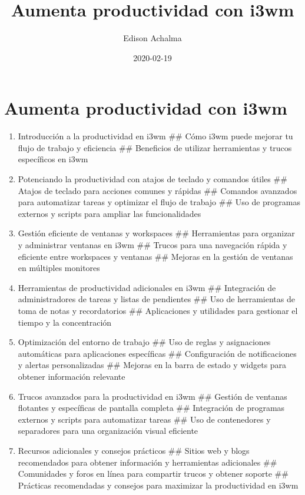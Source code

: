 \documentclass[
  jou,
  floatsintext,
  longtable,
  a4paper,
  nolmodern,
  notxfonts,
  notimes,
  12pt,
  colorlinks=true,linkcolor=blue,citecolor=blue,urlcolor=blue]{apa7}
\title{Aumenta productividad con i3wm}
\author{Edison Achalma}
\affiliation{
{Escuela Profesional de Economía, Universidad Nacional de San Cristóbal
de Huamanga}}
\date{2020-02-19}
\begin{document}
\maketitle


\hypertarget{toc}{}
\tableofcontents
\newpage
\section[Introduction]{Aumenta productividad con i3wm}

\setcounter{secnumdepth}{3}

\setlength\LTleft{0pt}




\begin{enumerate}
\def\labelenumi{\arabic{enumi}.}
\item
  Introducción a la productividad en i3wm \#\# Cómo i3wm puede mejorar
  tu flujo de trabajo y eficiencia \#\# Beneficios de utilizar
  herramientas y trucos específicos en i3wm
\item
  Potenciando la productividad con atajos de teclado y comandos útiles
  \#\# Atajos de teclado para acciones comunes y rápidas \#\# Comandos
  avanzados para automatizar tareas y optimizar el flujo de trabajo \#\#
  Uso de programas externos y scripts para ampliar las funcionalidades
\item
  Gestión eficiente de ventanas y workspaces \#\# Herramientas para
  organizar y administrar ventanas en i3wm \#\# Trucos para una
  navegación rápida y eficiente entre workspaces y ventanas \#\# Mejoras
  en la gestión de ventanas en múltiples monitores
\item
  Herramientas de productividad adicionales en i3wm \#\# Integración de
  administradores de tareas y listas de pendientes \#\# Uso de
  herramientas de toma de notas y recordatorios \#\# Aplicaciones y
  utilidades para gestionar el tiempo y la concentración
\item
  Optimización del entorno de trabajo \#\# Uso de reglas y asignaciones
  automáticas para aplicaciones específicas \#\# Configuración de
  notificaciones y alertas personalizadas \#\# Mejoras en la barra de
  estado y widgets para obtener información relevante
\item
  Trucos avanzados para la productividad en i3wm \#\# Gestión de
  ventanas flotantes y específicas de pantalla completa \#\# Integración
  de programas externos y scripts para automatizar tareas \#\# Uso de
  contenedores y separadores para una organización visual eficiente
\item
  Recursos adicionales y consejos prácticos \#\# Sitios web y blogs
  recomendados para obtener información y herramientas adicionales \#\#
  Comunidades y foros en línea para compartir trucos y obtener soporte
  \#\# Prácticas recomendadas y consejos para maximizar la productividad
  en i3wm
\end{enumerate}
\end{document}
